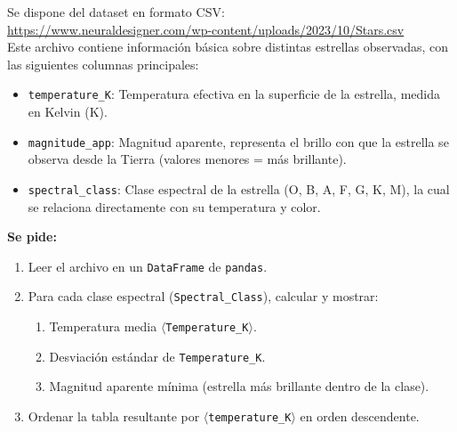 \documentclass[10pt]{article}
\begin{document}

\begin{tcolorbox}[title={Pregunta 2 – Mini-catálogo HIPPARCOS}]

Se dispone del dataset en formato CSV:\\
{\footnotesize
\url{https://www.neuraldesigner.com/wp-content/uploads/2023/10/Stars.csv}}\\

Este archivo contiene información básica sobre distintas estrellas observadas, con las siguientes columnas principales:

\begin{itemize}
    \item \texttt{temperature\_K}: Temperatura efectiva en la superficie de la estrella, medida en Kelvin (K).
    \item \texttt{magnitude\_app}: Magnitud aparente, representa el brillo con que la estrella se observa desde la Tierra (valores menores = más brillante).
    \item \texttt{spectral\_class}: Clase espectral de la estrella (O, B, A, F, G, K, M), la cual se relaciona directamente con su temperatura y color.
\end{itemize}

\vspace{3mm}
\textbf{Se pide:}

\begin{enumerate}
    \item Leer el archivo en un \texttt{DataFrame} de \texttt{pandas}.
    
    \item Para cada clase espectral (\texttt{Spectral\_Class}), calcular y mostrar:
    \begin{enumerate}
        \item Temperatura media $\langle$\texttt{Temperature\_K}$\rangle$.
        \item Desviación estándar de \texttt{Temperature\_K}.
        \item Magnitud aparente mínima (estrella más brillante dentro de la clase).
    \end{enumerate}

    \item Ordenar la tabla resultante por $\langle$\texttt{temperature\_K}$\rangle$ en orden descendente.
    

\end{enumerate}
\end{tcolorbox}
\end{document}
